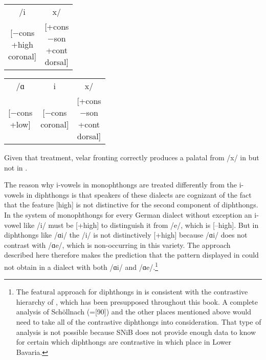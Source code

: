 \ea%
\label{ex:13:17}
\ea\label{ex:13:17a}\begin{tabular}[t]{@{}cc@{}}
    /i & x/\\
    \avm{[−cons\\+high\\coronal]} & \avm{[+cons\\−son\\+cont\\dorsal]}\\
    \end{tabular}
\ex\label{ex:13:17b}\begin{tabular}[t]{@{}ccc@{}}
    /ɑ & i & x/\\
    \avm{[−cons\\+low]} & \avm{[−cons\\coronal]} & \avm{[+cons\\−son\\+cont\\dorsal]}\\
    \end{tabular}
\z 
\z 

Given that treatment, velar fronting correctly produces a palatal from /x/ in  but not in .

The reason why i-vowels in monophthongs are treated differently from the i-vowels in diphthongs is that speakers of these dialects are cognizant of the fact that the feature [high] is not distinctive for the second component of diphthongs. In the system of monophthongs for every German dialect without exception an i-vowel like /i/ must be [+high] to distinguish it from /e/, which is [--high]. But in diphthongs like /ɑi/ the /i/ is not distinctively [+high] because /ɑi/ does not contrast with /ɑe/, which is non-occurring in this variety. The approach described here therefore makes the prediction that the pattern displayed in  could not obtain in a dialect with both /ɑi/ and /ɑe/.\footnote{The featural approach for diphthongs in  is consistent with the contrastive hierarchy of \citet{Dresher2009}, which has been presupposed throughout this book. A complete analysis of Schöllnach (=[90]) and the other places mentioned above would need to take all of the contrastive diphthongs into consideration. That type of analysis is not possible because SNiB does not provide enough data to know for certain which diphthongs are contrastive in which place in Lower Bavaria.}\largerpage

